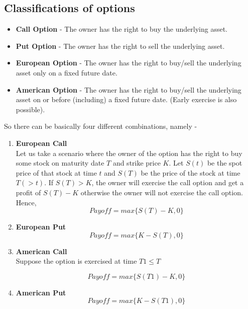 \subsection{Classifications of options}
\begin{itemize}
    \item \textbf{Call Option} - The owner has the right to buy the underlying asset.
    \item \textbf{Put Option} - The owner has the right to sell the underlying asset.
    \item \textbf{European Option} - The owner has the right to buy/sell the underlying asset only on a fixed future date.
    \item \textbf{American Option} - The owner has the right to buy/sell the underlying asset on or before (including) a fixed future date. (Early exercise is also possible).
\end{itemize}
So there can be basically four different combinations, namely -
\begin{enumerate}
    \item \textbf{European Call}
    \\Let us take a scenario where the owner of the option has the right to buy some stock on maturity date $T$ and strike price $K$. Let $S(t)$ be the spot price of that stock at time $t$ and $S(T)$ be the price of the stock at time $T(>t)$. If $S(T)>K$, the owner will exercise the call option and get a profit of $S(T)-K$ otherwise the owner will not exercise the call option. Hence,$$Payoff = max\{S(T)-K,0\}$$
    \item \textbf{European Put}
    $$Payoff = max\{K-S(T),0\}$$
    \item \textbf{American Call}
    \\Suppose the option is exercised at time $T1 \leq T$
    
    $$Payoff = max\{S(T1)-K,0\}$$
    \item \textbf{American Put}
    $$Payoff = max\{K-S(T1),0\}$$
\end{enumerate}